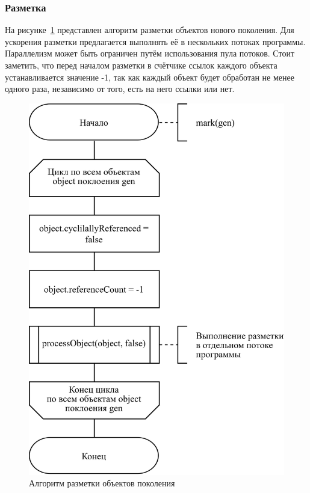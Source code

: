 \subsubsection{Разметка}

На рисунке~\ref{fig:mark-1} представлен алгоритм разметки объектов нового поколения. Для ускорения разметки предлагается выполнять её в нескольких потоках программы. Параллелизм может быть ограничен путём использования пула потоков. Стоит заметить, что перед началом разметки в счётчике ссылок каждого объекта устанавливается значение -1, так как каждый объект будет обработан не менее одного раза, независимо от того, есть на него ссылки или нет.

\begin{figure}[H]
	\centering
	\includegraphics[scale=0.185]{assets/mark-1.png}
	\caption{Алгоритм разметки объектов поколения}
	\label{fig:mark-1}
\end{figure}

